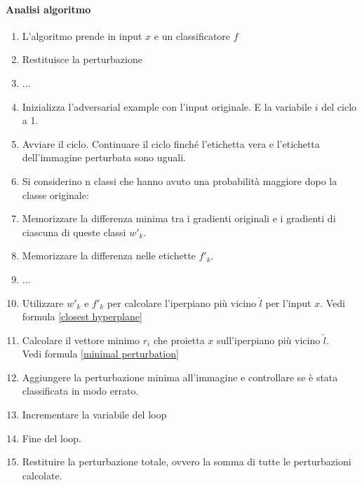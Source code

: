             \paragraph{Analisi algoritmo}
                \begin{enumerate}
                    \item L'algoritmo prende in input $x$ e un classificatore $f$
                    \item Restituisce la perturbazione 
                    \item ...
                    \item Inizializza l'adversarial example con l'input originale. E la variabile $i$ del ciclo a 1.
                    \item Avviare il ciclo. Continuare il ciclo finché l'etichetta vera e l'etichetta dell'immagine perturbata sono uguali.
                    \item Si considerino n classi che hanno avuto una probabilità maggiore dopo la classe originale:
                    \item Memorizzare la differenza minima tra i gradienti originali e i gradienti di ciascuna di queste classi $w'_k$.
                    \item Memorizzare la differenza nelle etichette $f'_k$.
                    \item ...
                    \item Utilizzare $w'_k$ e $f'_k$ per calcolare l'iperpiano più vicino $\hat{l}$ per l'input $x$. Vedi formula \ref{closest hyperplane}
                    \item Calcolare il vettore minimo $r_i$ che proietta $x$ sull'iperpiano più vicino $\hat{l}$.\\
                    Vedi formula \ref{minimal perturbation}
                    \item Aggiungere la perturbazione minima all'immagine e controllare se è stata classificata in modo errato.
                    \item Incrementare la variabile del loop
                    \item Fine del loop.
                    \item Restituire la perturbazione totale, ovvero la somma di tutte le perturbazioni calcolate.
                \end{enumerate}
            \newpage
    
